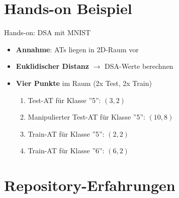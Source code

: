 \documentclass[usenames, dvipsnames, aspectratio=32]{beamer}
\begin{document}
\section{Hands-on Beispiel}

\begin{frame}{Hands-on: DSA mit MNIST}
    \begin{itemize}
        \item \textbf{Annahme}: ATs liegen in 2D-Raum vor
        \item \textbf{Euklidischer Distanz} $\to$ DSA-Werte berechnen
        \item \textbf{Vier Punkte} im Raum (2x Test, 2x Train) \vspace{.3em}
        \begin{enumerate}
            \item Test-AT für Klasse ''5'': $(3,2)$ \vspace{.3em}
            \item Manipulierter Test-AT für Klasse ''5'': $(10,8)$ \vspace{.3em}
            \item Train-AT für Klasse ''5'': $(2,2)$ \vspace{.3em}
            \item Train-AT für Klasse ''6'': $(6,2)$ \vspace{.3em}
        \end{enumerate}
    \end{itemize}
\end{frame}

\section{Repository-Erfahrungen}
\end{document}

